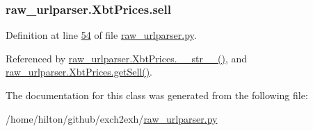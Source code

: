 \subsubsection[{\texorpdfstring{sell}{sell}}]{\setlength{\rightskip}{0pt plus 5cm}raw\+\_\+urlparser.\+Xbt\+Prices.\+sell}\hypertarget{classraw__urlparser_1_1_xbt_prices_a22b483cac27a5b17f9e7b265c219bb99}{}\label{classraw__urlparser_1_1_xbt_prices_a22b483cac27a5b17f9e7b265c219bb99}


Definition at line \hyperlink{raw__urlparser_8py_source_l00054}{54} of file \hyperlink{raw__urlparser_8py_source}{raw\+\_\+urlparser.\+py}.



Referenced by \hyperlink{raw__urlparser_8py_source_l00074}{raw\+\_\+urlparser.\+Xbt\+Prices.\+\_\+\+\_\+str\+\_\+\+\_\+()}, and \hyperlink{raw__urlparser_8py_source_l00065}{raw\+\_\+urlparser.\+Xbt\+Prices.\+get\+Sell()}.



The documentation for this class was generated from the following file\+:\begin{DoxyCompactItemize}
\item 
/home/hilton/github/exch2exh/\hyperlink{raw__urlparser_8py}{raw\+\_\+urlparser.\+py}\end{DoxyCompactItemize}

